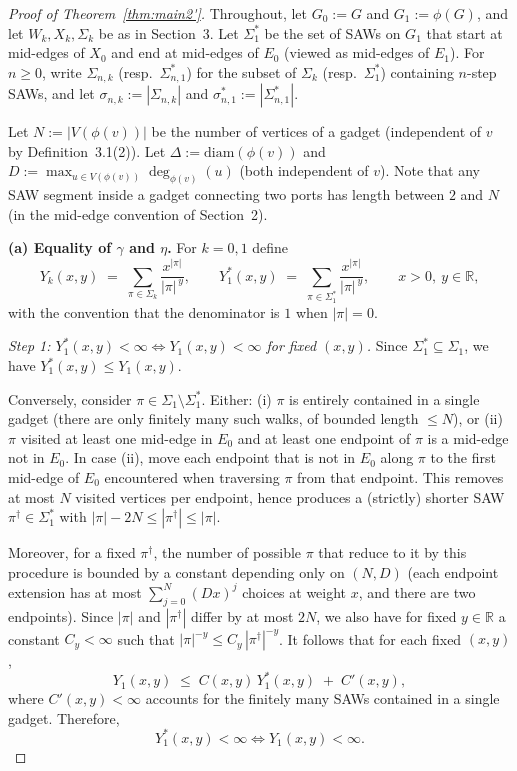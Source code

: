\documentclass[12pt]{amsart}
\theoremstyle{plain}
\numberwithin{equation}{section}
\numberwithin{theorem}{section}
\numberwithin{figure}{section}
\begin{document}
\begin{proof}[Proof of Theorem~\ref{thm:main2'}]
Throughout, let $G_0:=G$ and $G_1:=\phi(G)$, and let $W_k,X_k,\Sigma_k$ be as in
Section~3.  Let $\Sigma_1^\ast$ be the set of SAWs on $G_1$ that start at mid-edges of $X_0$
and end at mid-edges of $E_0$ (viewed as mid-edges of $E_1$).  For $n\ge 0$, write
$\Sigma_{n,k}$ (resp.\ $\Sigma_{n,1}^\ast$) for the subset of $\Sigma_k$ (resp.\ $\Sigma_1^\ast$)
containing $n$-step SAWs, and let $\sigma_{n,k}:=|\Sigma_{n,k}|$ and $\sigma_{n,1}^\ast:=|\Sigma_{n,1}^\ast|$.

Let $N:=|V(\phi(v))|$ be the number of vertices of a gadget (independent of $v$ by
Definition~3.1(2)).  Let $\Delta:=\mathrm{diam}(\phi(v))$ and $D:=\max_{u\in V(\phi(v))}\deg_{\phi(v)}(u)$
(both independent of $v$).  Note that any SAW segment inside a gadget connecting two
ports has length between $2$ and $N$ (in the mid-edge convention of Section~2).

\medskip\noindent
\textbf{(a) Equality of $\gamma$ and $\eta$.}
For $k=0,1$ define
\[
Y_k(x,y)\;=\;\sum_{\pi\in\Sigma_k}\frac{x^{|\pi|}}{|\pi|^{\,y}},
\qquad
Y_1^\ast(x,y)\;=\;\sum_{\pi\in\Sigma_1^\ast}\frac{x^{|\pi|}}{|\pi|^{\,y}},
\qquad x>0,\ y\in\mathbb{R},
\]
with the convention that the denominator is $1$ when $|\pi|=0$.

\smallskip\noindent
\emph{Step 1: $Y_1^\ast(x,y)<\infty \iff Y_1(x,y)<\infty$ for fixed $(x,y)$.}
Since $\Sigma_1^\ast\subseteq \Sigma_1$, we have $Y_1^\ast(x,y)\le Y_1(x,y)$.

Conversely, consider $\pi\in\Sigma_1\setminus\Sigma_1^\ast$.  Either:
(i) $\pi$ is entirely contained in a single gadget (there are only finitely many such walks,
of bounded length $\le N$), or
(ii) $\pi$ visited at least one mid-edge in $E_0$ and at least one endpoint of $\pi$ is a mid-edge not in $E_0$.
In case (ii), move each endpoint that is not in $E_0$ along $\pi$ to the first mid-edge of $E_0$
encountered when traversing $\pi$ from that endpoint.  This removes at most $N$ visited vertices
per endpoint, hence produces a (strictly) shorter SAW $\pi^\dagger\in \Sigma_1^\ast$ with
$|\pi|-2N\le |\pi^\dagger|\le |\pi|$.

Moreover, for a fixed $\pi^\dagger$, the number of possible $\pi$ that reduce to it by this procedure
is bounded by a constant depending only on $(N,D)$ (each endpoint extension has at most $\sum_{j=0}^{N}(Dx)^j$
choices at weight $x$, and there are two endpoints).  Since $|\pi|$ and $|\pi^\dagger|$ differ by at most $2N$,
we also have for fixed $y\in\mathbb{R}$ a constant $C_y<\infty$ such that
$|\pi|^{-y}\le C_y\,|\pi^\dagger|^{-y}$.
It follows that for each fixed $(x,y)$,
\[
Y_1(x,y)\;\le\;C(x,y)\,Y_1^\ast(x,y)\;+\;C'(x,y),
\]
where $C'(x,y)<\infty$ accounts for the finitely many SAWs contained in a single gadget.
Therefore,
\begin{equation}\label{eq:Ystar-equiv}
Y_1^\ast(x,y)<\infty \iff Y_1(x,y)<\infty .
\end{equation}


\end{proof}
\end{document}
